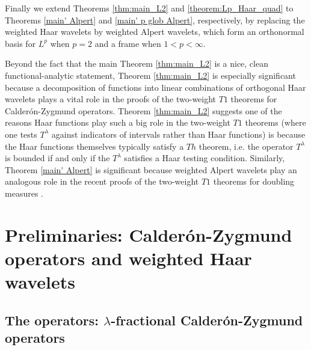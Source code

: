 \documentclass{amsart}%
\theoremstyle{plain}
\numberwithin{equation}{section}
\begin{document}
Finally we extend Theorems \ref{thm:main_L2} and \ref{theorem:Lp_Haar_quad} to Theorems \ref{main' Alpert} and \ref{main' p glob Alpert}, respectively, by replacing the weighted Haar wavelets by weighted Alpert wavelets, which form an orthonormal basis for $L^p$ when $p=2$ and a frame when $1<p<\infty$.

Beyond the fact that the main Theorem \ref{thm:main_L2}
is a nice, clean functional-analytic statement, Theorem \ref{thm:main_L2} is
especially significant because a decomposition of functions into linear
combinations of orthogonal Haar wavelets plays a vital role in the proofs of
the two-weight $T1$ theorems for Calder\'{o}n-Zygmund operators. Theorem \ref{thm:main_L2} suggests one of the reasons Haar functions play such
a big role in the two-weight $T1$ theorems (where one tests $T^{\lambda}$ against indicators of intervals rather than Haar functions) is because the Haar functions
themselves typically satisfy a $Th$ theorem, i.e. the operator
$T^{\lambda}$ is bounded if and only if the $T^{\lambda}$ satisfies a Haar
testing condition. Similarly, Theorem \ref{main' Alpert} is significant because weighted Alpert wavelets play an analogous role in the recent proofs of the two-weight $T1$ theorems for doubling measures \cite{RaSaWi, AlSaUr, SaWi}.

\section{Preliminaries: Calder\'on-Zygmund operators and weighted Haar wavelets}

\subsection{The operators: $\lambda$-fractional Calder\'{o}n-Zygmund
operators\label{Sec CZ}}
\end{document}
